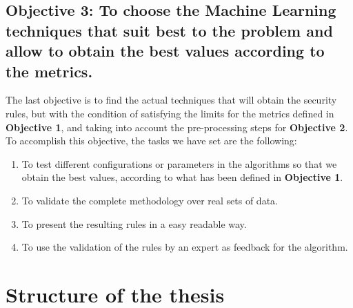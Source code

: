 
\newcommand{\objectivetechniques}{To choose the Machine Learning techniques that suit best to the problem and allow to obtain the best values according to the metrics.}

\subsection*{Objective 3: \objectivetechniques}
\label{subsec:intro:obj:fwork} 

The last objective is to find the actual techniques that will obtain the security rules, but with the condition of satisfying the limits for the metrics defined in \textbf{Objective 1}, and taking into account the pre-processing steps for \textbf{Objective 2}. To accomplish this objective, the tasks we have set are the following:

\begin{enumerate}
	\item To test different configurations or parameters in the algorithms so that we obtain the best values, according to what has been defined in \textbf{Objective 1}.
	\item To validate the complete methodology over real sets of data.
	\item To present the resulting rules in a easy readable way.
	\item To use the validation of the rules by an expert as feedback for the algorithm.
\end{enumerate}



\section{Structure of the thesis}
\label{sec:intro:structure}


